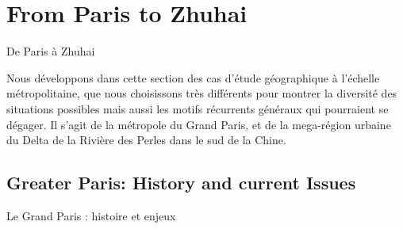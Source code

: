 



\newpage

\section{From Paris to Zhuhai}{De Paris à Zhuhai}

\label{sec:casestudies}



Nous développons dans cette section des cas d'étude géographique à l'échelle métropolitaine, que nous choisissons très différents pour montrer la diversité des situations possibles mais aussi les motifs récurrents généraux qui pourraient se dégager. Il s'agit de la métropole du Grand Paris, et de la mega-région urbaine du Delta de la Rivière des Perles dans le sud de la Chine.



\subsection{Greater Paris: History and current Issues}{Le Grand Paris : histoire et enjeux}


